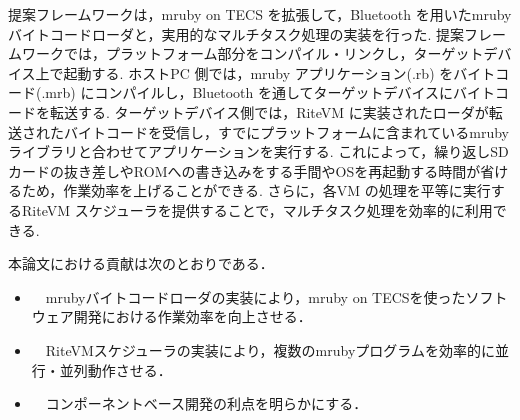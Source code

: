 \documentclass[submit,techrep]{ipsj}
\begin{document}
提案フレームワークは，mruby on TECS を拡張して，Bluetooth を用いたmruby バイトコードローダと，実用的なマルチタスク処理の実装を行った.
提案フレームワークでは，プラットフォーム部分をコンパイル・リンクし，ターゲットデバイス上で起動する.
ホストPC 側では，mruby アプリケーション(.rb) をバイトコード(.mrb) にコンパイルし，Bluetooth を通してターゲットデバイスにバイトコードを転送する. 
ターゲットデバイス側では，RiteVM に実装されたローダが転送されたバイトコードを受信し，すでにプラットフォームに含まれているmruby ライブラリと合わせてアプリケーションを実行する.
これによって，繰り返しSDカードの抜き差しやROMへの書き込みをする手間やOSを再起動する時間が省けるため，作業効率を上げることができる.
さらに，各VM の処理を平等に実行するRiteVM スケジューラを提供することで，マルチタスク処理を効率的に利用できる.

本論文における貢献は次のとおりである．
\begin{itemize}
        \item　mrubyバイトコードローダの実装により，mruby on TECSを使ったソフトウェア開発における作業効率を向上させる．
        \item　RiteVMスケジューラの実装により，複数のmrubyプログラムを効率的に並行・並列動作させる．
        \item　コンポーネントベース開発の利点を明らかにする．
\end{itemize}
\end{document}
